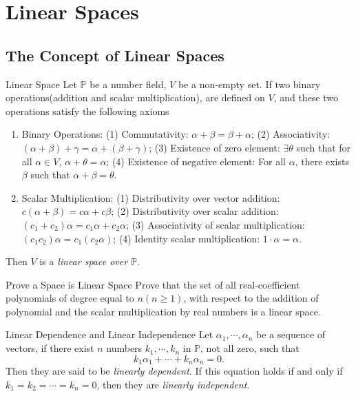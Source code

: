 
\section{Linear Spaces}

\subsection{The Concept of Linear Spaces}

\begin{definition}{Linear Space}{}
  Let $\mathbb{P}$ be a number field, $V$ be a non-empty set.
  If two binary operations(addition and scalar multiplication),
  are defined on $V$, and these two operations satisfy the following axioms
  \begin{enumerate}
  \item Binary Operations:
    (1) Commutativity: $\alpha + \beta = \beta + \alpha$;
    (2) Associativity: $(\alpha + \beta) + \gamma = \alpha + (\beta + \gamma)$;
    (3) Existence of zero element: $\exists \theta$ such that for all $\alpha
    \in V$, $\alpha + \theta = \alpha$;
    (4) Existence of negative element: For all $\alpha$, there exists $\beta$ such that $\alpha + \beta
    = \theta$.
  \item Scalar Multiplication:
    (1) Distributivity over vector addition: $c(\alpha + \beta) = c\alpha + c\beta$;
    (2) Distributivity over scalar addition: $(c_1 + c_2)\alpha = c_1 \alpha +
    c_2 \alpha$;
    (3) Associativity of scalar multiplication: $(c_1c_2)\alpha = c_1(c_2\alpha)$;
    (4) Identity scalar multiplication: $1 \cdot \alpha = \alpha$.
  \end{enumerate}
  Then $V$ is a \emph{linear space over $\mathbb{P}$}.
\end{definition}

\begin{example}{Prove a Space is Linear Space}{}
  Prove that the set of all real-coefficient polynomials of degree equal to $n
  (n \geq 1)$, with respect to the addition of polynomial and the scalar multiplication
  by real numbers is a linear space.
\end{example}

\begin{definition}{Linear Dependence and Linear Independence}{}
  Let $\alpha_1, \cdots, \alpha_n$ be a sequence of vectors,
  if there exist $n$ numbers $k_1, \cdots, k_n$ in $\mathbb{P}$, not all zero, such that
  \begin{equation}
    k_1 \alpha_1 + \cdots + k_n \alpha_n = 0.
  \end{equation}
  Then they are said to be \emph{linearly dependent}.
  If this equation holds if and only if $k_1 = k_2 = \cdots = k_n = 0$,
  then they are \emph{linearly independent}.
\end{definition}

